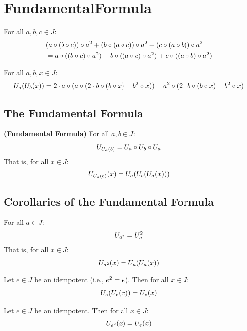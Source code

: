 \section{FundamentalFormula}

\begin{lemma}
For all $a, b, c \in J$:
\begin{align*}
&(a \circ (b \circ c)) \circ a^{2} + (b \circ (a \circ c)) \circ a^{2} + (c \circ (a \circ b)) \circ a^{2} \\
&= a \circ ((b \circ c) \circ a^{2}) + b \circ ((a \circ c) \circ a^{2}) + c \circ ((a \circ b) \circ a^{2})
\end{align*}
\end{lemma}

\begin{lemma}[U\_U\_expand]
For all $a, b, x \in J$:
\[ U_{a}(U_{b}(x)) = 2 \cdot a \circ (a \circ (2 \cdot b \circ (b \circ x) - b^{2} \circ x)) - a^{2} \circ (2 \cdot b \circ (b \circ x) - b^{2} \circ x) \]
\end{lemma}

\subsection{The Fundamental Formula}

\begin{theorem}
\textbf{(Fundamental Formula)}
For all $a, b \in J$:
\[ U_{U_{a}(b)} = U_{a} \circ U_{b} \circ U_{a} \]
That is, for all $x \in J$:
\[ U_{U_{a}(b)}(x) = U_{a}(U_{b}(U_{a}(x))) \]
\end{theorem}

\subsection{Corollaries of the Fundamental Formula}

\begin{theorem}[U\_jsq]
For all $a \in J$:
\[ U_{a^{2}} = U_{a}^2 \]
That is, for all $x \in J$:
\[ U_{a^{2}}(x) = U_{a}(U_{a}(x)) \]
\end{theorem}

\begin{theorem}
Let $e \in J$ be an idempotent (i.e., $e^{2} = e$). Then for all $x \in J$:
\[ U_{e}(U_{e}(x)) = U_{e}(x) \]
\end{theorem}

\begin{theorem}
Let $e \in J$ be an idempotent. Then for all $x \in J$:
\[ U_{e^{2}}(x) = U_{e}(x) \]
\end{theorem}

